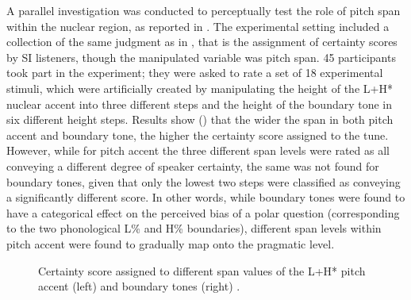 \documentclass[output=paper,colorlinks,citecolor=brown]{langscibook}
\begin{document}
A parallel investigation was conducted to perceptually test the role of pitch span within the nuclear region, as reported in \citet{Orrico+2020}. The experimental setting included a collection of the same judgment as in \citet{orrico2022}, that is the assignment of certainty scores by SI listeners, though the manipulated variable was pitch span. 45 participants took part in the experiment; they were asked to rate a set of 18 experimental stimuli, which were artificially created by manipulating the height of the L+H* nuclear accent into three different steps and the height of the boundary tone in six different height steps. Results show () that the wider the span in both pitch accent and boundary tone, the higher the certainty score assigned to the tune. However, while for pitch accent the three different span levels were rated as all conveying a different degree of speaker certainty, the same was not found for boundary tones, given that only the lowest two steps were classified as conveying a significantly different score. In other words, while boundary tones were found to have a categorical effect on the perceived bias of a polar question (corresponding to the two phonological L\% and H\% boundaries), different span levels within pitch accent were found to gradually map onto the pragmatic level.

\begin{figure}
  \caption{Certainty score assigned to different span values of the L+H* pitch accent (left) and boundary tones (right) \citep{Orrico+2020}.}
  \label{fig4}
\end{figure}
\end{document}
